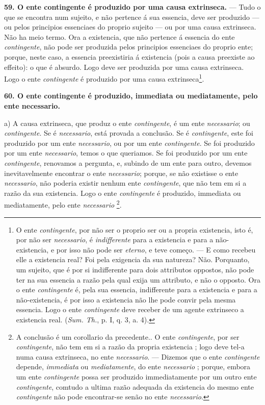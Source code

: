 \textbf{59. O ente contingente é produzido por uma causa extrinseca.} --- Tudo o que se encontra num sujeito, e não pertence á sua essencia, deve ser produzido --- ou pelos principios essenciaes do proprio sujeito --- ou por uma causa extrinseca. Não ha meio termo. Ora a existencia, que não pertence á essencia do ente \emph{contingente}, não pode ser produzida pelos principios essenciaes do proprio ente; porque, neste caso, a essencia preexistiria á existencia (pois a causa preexiste ao effeito): o que é absurdo. Logo deve ser produzida por uma causa extrinseca. Logo o ente \emph{contingente} é produzido por uma causa extrinseca\footnote{O ente \emph{contingente}, por não ser o proprio ser ou a propria existencia, isto é, por não ser \emph{necessario}, é \emph{indifferente} para a existencia e para a não-existencia, e por isso não pode ser \emph{eterno}, e teve começo. --- E como recebeu elle a existencia real? Foi pela exigencia da sua natureza? Não. Porquanto, um sujeito, que é por si indifferente para dois attributos oppostos, não pode ter na sua essencia a razão pela qual exija um attributo, e não o opposto. Ora o ente \emph{contingente} é, pela sua essencia, indifferente para a existencia e para a não-existencia, é por isso a existencia não lhe pode convir pela mesma essencia. Logo o ente \emph{contingente} deve receber de um agente extrinseco a existencia real. (\emph{Sum. Th.}, p. I, q. 3, a. 4).}.

 \textbf{60. O ente contingente é produzido, immediata ou mediatamente, pelo ente necessario.}

a) A causa extrinseca, que produz o ente \emph{contingente}, é um ente \emph{necessario}; ou \emph{contingente}. Se é \emph{necessario}, está provada a conclusão. Se é \emph{contingente}, este foi produzido por um ente \emph{necessario}, ou por um ente \emph{contingente}. Se foi produzido por um ente \emph{necessario}, temos o que queriamos. Se foi produzido por um ente \emph{contingente}, renovamos a pergunta, e, subindo de um ente para outro, devemos inevitavelmente encontrar o ente \emph{necessario}; porque, se não existisse o ente \emph{necessario}, não poderia existir nenhum ente \emph{contingente}, que não tem em si a razão da sua existencia. Logo o ente \emph{contingente} é produzido, immediata ou mediatamente, pelo ente \emph{necessario} \footnote{A conclusão é um corollario da precedente.. O ente \emph{contingente}, por ser \emph{contingente}, não tem em si a razão da propria existencia ; logo deve tel-a numa causa extrinseca, no ente \emph{necessario}. --- Dizemos que o ente \emph{contingente} depende, \emph{immediata} ou \emph{mediatamente}, do ente \emph{necessario} ; porque, embora um ente \emph{contingente} possa ser produzido immediatamente por um outro ente \emph{contingente}, comtudo a ultima razão adequada da existencia do mesmo ente \emph{contingente} não pode encontrar-se senão no ente \emph{necessario}.}.

